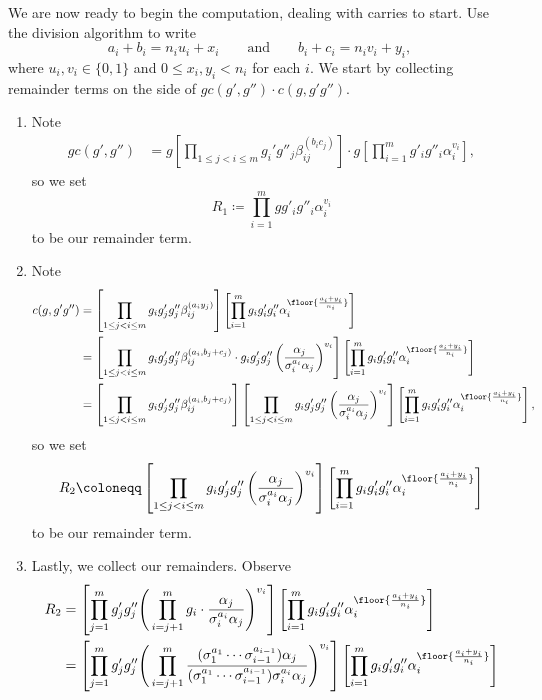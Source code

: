 We are now ready to begin the computation, dealing with carries to start. Use the division algorithm to write
\[a_i+b_i=n_iu_i+x_i\qquad\text{and}\qquad b_i+c_i=n_iv_i+y_i,\]
where $u_i,v_i\in\{0,1\}$ and $0\le x_i,y_i<n_i$ for each $i$. We start by collecting remainder terms on the side of $gc(g',g'')\cdot c(g,g'g'')$.
\begin{enumerate}
	\item Note
	\begin{align*}
		gc(g',g'') &= g\left[\prod_{1\le j<i\le m}g_i'g''_j\beta_{ij}^{(b_ic_j)}\right]\cdot g\left[\prod_{i=1}^mg'_ig''_i\alpha_i^{v_i}\right],
	\end{align*}
	so we set
	\[R_1\coloneqq\prod_{i=1}^mgg'_ig''_i\alpha_i^{v_i}\]
	to be our remainder term.
	\item Note
	\begin{align*}
		c(g,g'g'') &= \left[\prod_{1\le j<i\le m}g_ig'_jg''_j\beta_{ij}^{(a_iy_j)}\right]\left[\prod_{i=1}^mg_ig'_ig''_i\alpha_i^{\floor{\frac{a_i+y_i}{n_i}}}\right] \\
		&= \left[\prod_{1\le j<i\le m}g_ig'_jg''_j\beta_{ij}^{(a_i,b_j+c_j)}\cdot g_ig'_jg''_j\left(\frac{\alpha_j}{\sigma_i^{a_i}\alpha_j}\right)^{v_i}\right]\left[\prod_{i=1}^mg_ig'_ig''_i\alpha_i^{\floor{\frac{a_i+y_i}{n_i}}}\right] \\
		&= \left[\prod_{1\le j<i\le m}g_ig'_jg''_j\beta_{ij}^{(a_i,b_j+c_j)}\right]\left[\prod_{1\le j<i\le m}g_ig'_jg''_j\left(\frac{\alpha_j}{\sigma_i^{a_i}\alpha_j}\right)^{v_i}\right]\left[\prod_{i=1}^mg_ig'_ig''_i\alpha_i^{\floor{\frac{a_i+y_i}{n_i}}}\right],
	\end{align*}
	so we set
	\[R_2\coloneqq\left[\prod_{1\le j<i\le m}g_ig'_jg''_j\left(\frac{\alpha_j}{\sigma_i^{a_i}\alpha_j}\right)^{v_i}\right]\left[\prod_{i=1}^mg_ig'_ig''_i\alpha_i^{\floor{\frac{a_i+y_i}{n_i}}}\right]\]
	to be our remainder term.
	\item Lastly, we collect our remainders. Observe
	\begin{align*}
		R_2 &= \left[\prod_{j=1}^mg'_jg''_j\Bigg(\prod_{i=j+1}^mg_i\cdot\frac{\alpha_j}{\sigma_i^{a_i}\alpha_j}\Bigg)^{v_i}\right]\left[\prod_{i=1}^mg_ig'_ig''_i\alpha_i^{\floor{\frac{a_i+y_i}{n_i}}}\right] \\
		&= \left[\prod_{j=1}^mg'_jg''_j\Bigg(\prod_{i=j+1}^m\frac{(\sigma_1^{a_1}\cdots\sigma_{i-1}^{a_{i-1}})\alpha_j}{(\sigma_1^{a_1}\cdots\sigma_{i-1}^{a_{i-1}})\sigma_i^{a_i}\alpha_j}\Bigg)^{v_i}\right]\left[\prod_{i=1}^mg_ig'_ig''_i\alpha_i^{\floor{\frac{a_i+y_i}{n_i}}}\right] \\

\end{align*}
\end{enumerate}
